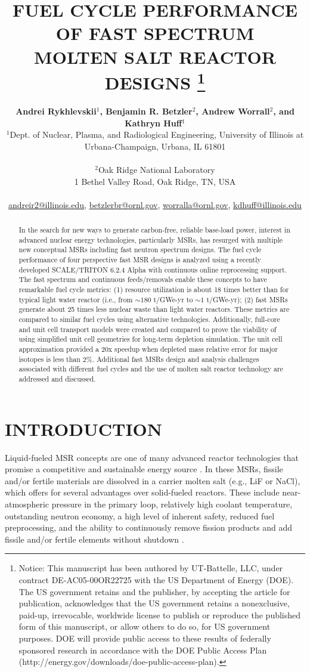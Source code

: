 \documentclass[letterpaper]{mandc2019}
\title{FUEL CYCLE PERFORMANCE OF FAST SPECTRUM \\
  MOLTEN SALT REACTOR DESIGNS
\footnote{Notice:  This manuscript has been authored by UT-Battelle, LLC, under contract DE-AC05-00OR22725 with the US Department of Energy (DOE). The US government retains and the publisher, by accepting the article for publication, acknowledges that the US government retains a nonexclusive, paid-up, irrevocable, worldwide license to publish or reproduce the published form of this manuscript, or allow others to do so, for US government purposes. DOE will provide public access to these results of federally sponsored research in accordance with the DOE Public Access Plan (http://energy.gov/downloads/doe-public-access-plan).}
		}
\author{%
  \textbf{Andrei Rykhlevskii$^1$, Benjamin R. Betzler$^2$, Andrew Worrall$^2$, and Kathryn Huff$^1$} \\
  $^1$Dept. of Nuclear, Plasma, and Radiological Engineering, University of Illinois at \\
  Urbana-Champaign, Urbana, IL 61801 \\
\\
  $^2$Oak Ridge National Laboratory \\
1 Bethel Valley Road, Oak Ridge, TN, USA  \\
\\
  \url{andreir2@illinois.edu}, \url{betzlerbr@ornl.gov}, \url{worralla@ornl.gov}, \url{kdhuff@illinois.edu}
}
\begin{document}
\maketitle
\justify

\begin{abstract}
In the search for new ways to generate carbon-free, reliable 
base-load power, interest in advanced nuclear energy technologies, 
particularly \glspl{MSR}, has resurged with multiple new conceptual \glspl{MSR} including fast neutron spectrum designs. The fuel cycle performance of four perspective fast \gls{MSR} designs is analyzed using a recently developed SCALE/TRITON 6.2.4 Alpha with continuous online reprocessing support. The fast spectrum and continuous feeds/removals enable these concepts to have remarkable fuel  cycle metrics: (1) resource utilization is about 18 times better than for typical light water reactor (i.e., from $\sim180$ t/GWe-yr to $\sim1$ t/GWe-yr); (2) fast \glspl{MSR} generate about 25 times less nuclear waste than light water reactors. These metrics are compared to similar fuel cycles using alternative technologies. Additionally, full-core and unit cell transport models were created and compared to prove the viability of using simplified unit cell geometries for long-term depletion simulation. The unit cell approximation provided a 20x speedup when depleted mass relative error for major isotopes is less than 2\%. Additional fast \glspl{MSR} design and analysis challenges associated with different fuel cycles and the use of molten salt reactor technology are addressed and discussed.
\end{abstract}

\section{INTRODUCTION}
\label{sec:intro}
Liquid-fueled \gls{MSR} concepts are one of many advanced reactor technologies that promise a competitive and sustainable energy source \cite{siemer_why_2015}. In these \gls{MSR}s, fissile and/or fertile materials are dissolved in a carrier molten salt (e.g., LiF or NaCl), which offers for several advantages over solid-fueled reactors. These include near-atmospheric pressure in the primary loop, relatively high coolant temperature, outstanding neutron economy, a high level of inherent safety,
reduced fuel preprocessing, and the ability to continuously remove fission products and add fissile and/or fertile elements without shutdown \cite{leblanc_molten_2010}.
\end{document}
